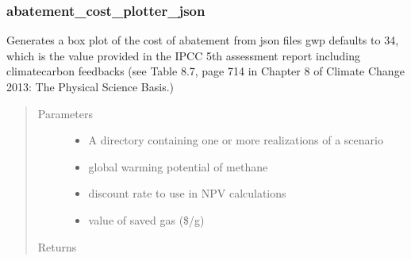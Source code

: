 \documentclass[letterpaper,10pt,english]{sphinxmanual}
\begin{document}
\subsubsection{abatement\_cost\_plotter\_json}
\label{\detokenize{index:abatement-cost-plotter-json}}

\begin{fulllineitems}
\label{\detokenize{index:feast.ResultsProcessing.plotting_functions.abatement_cost_plotter_json}}
Generates a box plot of the cost of abatement from json files
gwp defaults to 34, which is the value provided in the IPCC 5th assessment report including climate\sphinxhyphen{}carbon feedbacks
(see Table 8.7, page 714 in Chapter 8 of Climate Change 2013: The Physical Science Basis.)
\begin{quote}\begin{description}
\item[{Parameters}] \leavevmode\begin{itemize}
\item {} 
 \textendash{} A directory containing one or more realizations of a scenario

\item {} 
 \textendash{} global warming potential of methane

\item {} 
 \textendash{} discount rate to use in NPV calculations

\item {} 
 \textendash{} value of saved gas (\$/g)

\end{itemize}

\item[{Returns}] \leavevmode


\end{description}\end{quote}

\end{fulllineitems}
\end{document}
